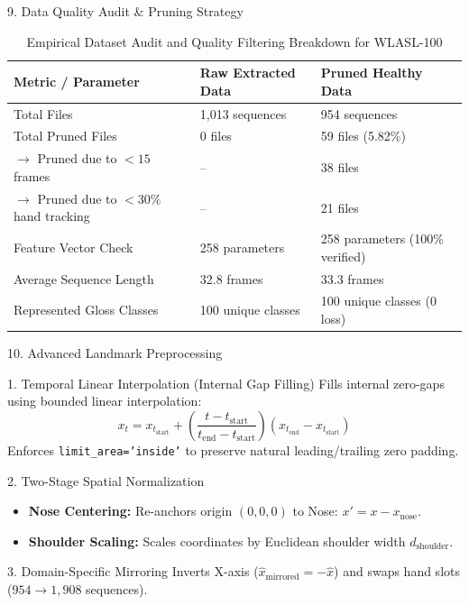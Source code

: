 \documentclass[aspectratio=169, 10pt]{beamer}
\begin{document}
\begin{frame}{9. Data Quality Audit \& Pruning Strategy}
  \begin{table}
    \centering
    \caption{Empirical Dataset Audit and Quality Filtering Breakdown for WLASL-100}
    \small
    \begin{tabular}{lll}
      \toprule
      \textbf{Metric / Parameter} & \textbf{Raw Extracted Data} & \textbf{Pruned Healthy Data} \\
      \midrule
      Total Files & 1,013 sequences & 954 sequences \\
      Total Pruned Files & 0 files & 59 files (5.82\%) \\
      \quad $\rightarrow$ Pruned due to $< 15$ frames & -- & 38 files \\
      \quad $\rightarrow$ Pruned due to $< 30\%$ hand tracking & -- & 21 files \\
      Feature Vector Check & 258 parameters & 258 parameters (100\% verified) \\
      Average Sequence Length & 32.8 frames & 33.3 frames \\
      Represented Gloss Classes & 100 unique classes & 100 unique classes (0 loss) \\
      \bottomrule
    \end{tabular}
  \end{table}
\end{frame}

\begin{frame}{10. Advanced Landmark Preprocessing}
  \begin{block}{1. Temporal Linear Interpolation (Internal Gap Filling)}
    Fills internal zero-gaps using bounded linear interpolation:
    $$x_t = x_{t_{\text{start}}} + \left( \frac{t - t_{\text{start}}}{t_{\text{end}} - t_{\text{start}}} \right) (x_{t_{\text{end}}} - x_{t_{\text{start}}}) \text{}$$
    Enforces \texttt{limit\_area='inside'} to preserve natural leading/trailing zero padding.
  \end{block}

  \begin{block}{2. Two-Stage Spatial Normalization}
    \begin{itemize}
      \item \textbf{Nose Centering:} Re-anchors origin $(0,0,0)$ to Nose: $x' = x - x_{\text{nose}}$.
      \item \textbf{Shoulder Scaling:} Scales coordinates by Euclidean shoulder width $d_{\text{shoulder}}$.
    \end{itemize}
  \end{block}

  \begin{block}{3. Domain-Specific Mirroring}
    Inverts X-axis ($\hat{x}_{\text{mirrored}} = -\hat{x}$) and swaps hand slots ($954 \rightarrow 1,908$ sequences).
  \end{block}
\end{frame}
\end{document}
